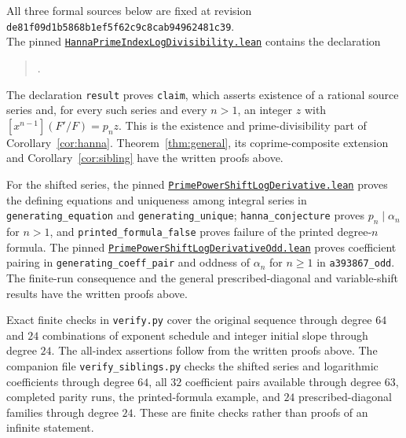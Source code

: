 \documentclass[11pt]{article}
\newcommand{\coeff}[1]{[x^{#1}]}
\begin{document}
All three formal sources below are fixed at revision\\
\texttt{de81f09d1b5868b1ef5f62c9c8cab94962481c39}.\\
The pinned \href{https://github.com/the-omega-institute/trureturing/blob/de81f09d1b5868b1ef5f62c9c8cab94962481c39/D5/S1/Recurrence/Invariants/HannaPrimeIndexLogDivisibility.lean}{\texttt{HannaPrimeIndexLogDivisibility.lean}}
contains the declaration
\begin{quote}\small
{}.
\end{quote}
The declaration \texttt{result} proves \texttt{claim}, which asserts
existence of a rational source
series and, for every such series and every $n>1$, an integer $z$ with
$\coeff{n-1}(F'/F)=p_nz$. This is the existence and prime-divisibility
part of Corollary~\ref{cor:hanna}. Theorem~\ref{thm:general}, its
coprime-composite extension and Corollary~\ref{cor:sibling} have the
written proofs above.

For the shifted series, the pinned
\href{https://github.com/the-omega-institute/trureturing/blob/de81f09d1b5868b1ef5f62c9c8cab94962481c39/D5/S1/Recurrence/Parity/PrimePowerShiftLogDerivative.lean}{\texttt{PrimePowerShiftLogDerivative.lean}}
proves the defining equations and uniqueness among integral
series in \texttt{generating\_equation} and \texttt{generating\_unique};
\texttt{hanna\_conjecture} proves $p_n\mid\alpha_n$ for $n>1$, and
\texttt{printed\_formula\_false} proves failure of the printed degree-$n$
formula. The pinned
\href{https://github.com/the-omega-institute/trureturing/blob/de81f09d1b5868b1ef5f62c9c8cab94962481c39/D5/S1/Recurrence/Parity/PrimePowerShiftLogDerivativeOdd.lean}{\texttt{PrimePowerShiftLogDerivativeOdd.lean}}
proves coefficient pairing in \texttt{generating\_coeff\_pair}
and oddness of $\alpha_n$ for $n\ge1$ in \texttt{a393867\_odd}.
The finite-run consequence and the general prescribed-diagonal and
variable-shift results have the written proofs above.

Exact finite checks in \texttt{verify.py} cover the original sequence
through degree $64$ and $24$ combinations of exponent schedule and integer
initial slope through degree $24$. The all-index assertions follow from
the written proofs above. The companion file \texttt{verify\_siblings.py}
checks the shifted series and logarithmic coefficients through degree $64$,
all $32$ coefficient pairs available through degree $63$, completed parity
runs, the printed-formula example, and $24$ prescribed-diagonal families
through degree $24$. These are finite checks rather than proofs of an
infinite statement.
\end{document}
